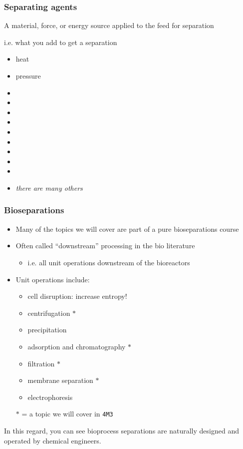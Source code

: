 \begin{frame}\frametitle{Separating agents}	
	\begin{exampleblock}
		{A material, force, or energy source applied to the feed for separation }
	\end{exampleblock}
	\vspace{12pt}
	i.e. what you add to get a separation
	\vspace{12pt}
	\begin{itemize}
		\item	heat
		\item	pressure
		\item	\iftoggle{instructor}{vacuum}{}
		\item	\iftoggle{instructor}{membrane}{}
		\item	\iftoggle{instructor}{filter media}{}
		\item	\iftoggle{instructor}{electric field}{}
		\item	\iftoggle{instructor}{flow}{}
		\item	\iftoggle{instructor}{temperature gradient}{}
		\item	\iftoggle{instructor}{concentration gradient}{}
		\item	\iftoggle{instructor}{gravitational field}{}
		\item	\iftoggle{instructor}{adsorbent}{}
		\item	\emph{there are many others}
	\end{itemize}
\end{frame}

\begin{frame}\frametitle{Bioseparations}	
	\begin{itemize}
		\item	Many of the topics we will cover are part of a pure bioseparations course
		\item	Often called ``downstream'' processing in the bio literature
		\begin{itemize}
			\item	i.e. all unit operations downstream of the bioreactors
		\end{itemize}
		\item	Unit operations include:
		\begin{itemize}
			\item	cell disruption: increase entropy!
			\item	centrifugation $\ast$
			\item	precipitation
			\item	adsorption and chromatography $\ast$
			\item	filtration $\ast$
			\item	membrane separation $\ast$
			\item	electrophoresis
		\end{itemize}
		\vspace{12pt}
		$\ast$ = a topic we will cover in \texttt{4M3}
	\end{itemize}
	\vspace{12pt}
	In this regard, you can see bioprocess separations are naturally designed and operated by chemical engineers.
\end{frame}


